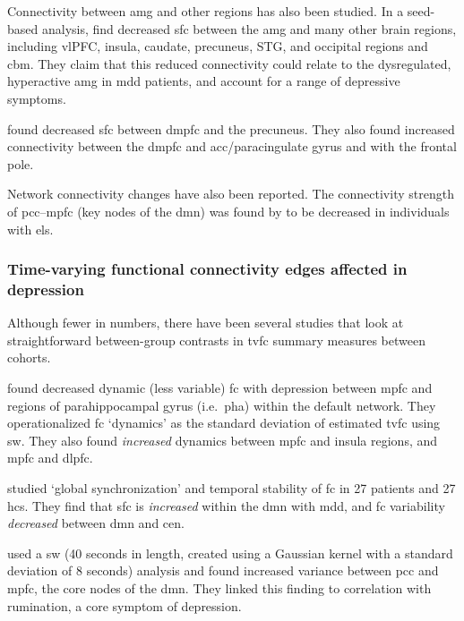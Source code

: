 Connectivity between \gls{amg} and other regions has also been studied.
In a seed-based analysis, \textcite{Ramasubbu2014} find decreased \gls{sfc} between the \gls{amg} and many other brain regions, including vlPFC, insula, caudate, precuneus, STG, and occipital regions and \gls{cbm}.
They claim that this reduced connectivity could relate to the dysregulated, hyperactive \gls{amg} in \gls{mdd} patients, and account for a range of depressive symptoms.

\textcite{Rzepa2018} found decreased \gls{sfc} between \gls{dmpfc} and the precuneus.
They also found increased connectivity between the \gls{dmpfc} and \gls{acc}/paracingulate gyrus and with the frontal pole.

Network connectivity changes have also been reported.
The connectivity strength of \gls{pcc}--\gls{mpfc} (key nodes of the \gls{dmn}) was found by \textcite{Philip2013} to be decreased in individuals with \gls{els}.

\subsubsection{Time-varying functional connectivity edges affected in depression}

Although fewer in numbers, there have been several studies that look at straightforward between-group contrasts in \gls{tvfc} summary measures between cohorts.

\textcite{Kaiser2015} found decreased dynamic (less variable) \gls{fc} with depression between \gls{mpfc} and regions of parahippocampal gyrus (i.e.~\gls{pha}) within the default network.
They operationalized \gls{fc} `dynamics' as the standard deviation of estimated \gls{tvfc} using \gls{sw}.
They also found \emph{increased} dynamics between \gls{mpfc} and insula regions, and \gls{mpfc} and \gls{dlpfc}.

\textcite{Demirtas2016} studied `global synchronization' and temporal stability of \gls{fc} in 27 patients and 27 \glspl{hc}.
They find that \gls{sfc} is \emph{increased} within the \gls{dmn} with \gls{mdd}, and \gls{fc} variability \emph{decreased} between \gls{dmn} and \gls{cen}.

\textcite{Wise2017} used a \gls{sw} (40 seconds in length, created using a Gaussian kernel with a standard deviation of 8 seconds) analysis and found increased variance between \gls{pcc} and \gls{mpfc}, the core nodes of the \gls{dmn}.
They linked this finding to correlation with rumination, a core symptom of depression.

